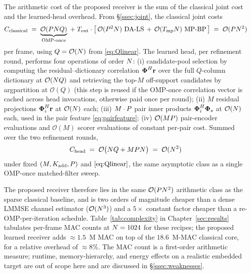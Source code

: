 The arithmetic cost of the proposed receiver is the sum of the classical joint cost and the learned-head overhead. From \S\ref{ssec:joint}, the classical joint costs
\begin{equation}
C_{\text{classical}} \;=\; \underbrace{\mathcal{O}(\Ppath \Nsub Q)}_{\text{OMP-once}} \;+\; T_\text{out} \cdot \bigl[\,\mathcal{O}(\Ppath^2 \Nsub)\ \text{DA-LS}\,+\,\mathcal{O}(T_\text{mp} \Nsub)\ \text{MP-BP}\,\bigr] \;=\; \mathcal{O}(\Ppath \Nsub^2) \label{eq:classcomplex}
\end{equation}
per frame, using $Q = \mathcal{O}(N)$ from \eqref{eq:Qlinear}. The learned head, per refinement round, performs four operations of order $N$:
(i) candidate-pool selection by computing the residual--dictionary correlation $\boldsymbol{\Phi}^H \mathbf{r}$ over the full $Q$-column dictionary at $\mathcal{O}(N Q)$ and retrieving the top-$M$ off-support candidates by argpartition at $\mathcal{O}(Q)$ (this step is reused if the OMP-once correlation vector is cached across head invocations, otherwise paid once per round);
(ii) $M$ residual projections $\boldsymbol{\Phi}_i^H \mathbf{r}$ at $\mathcal{O}(N)$ each;
(iii) $M \cdot P$ pair inner products $\boldsymbol{\Phi}_i^H \boldsymbol{\Phi}_s$ at $\mathcal{O}(N)$ each, used in the pair feature \eqref{eq:pairfeature};
(iv) $\mathcal{O}(M P)$ pair-encoder evaluations and $\mathcal{O}(M)$ scorer evaluations of constant per-pair cost.
Summed over the two refinement rounds,
\begin{equation}
C_{\text{head}} \;=\; \mathcal{O}\bigl(N Q + M P N\bigr) \;=\; \mathcal{O}(N^2) \label{eq:headcomplex}
\end{equation}
under fixed $(M, K_{\mathrm{add}}, P)$ and $\eqref{eq:Qlinear}$, the same asymptotic class as a single OMP-once matched-filter sweep.

The proposed receiver therefore lies in the same $\mathcal{O}(P N^2)$ arithmetic class as the sparse classical baseline, and is two orders of magnitude cheaper than a dense LMMSE channel estimator ($\mathcal{O}(N^3)$) and a $5\times$ constant factor cheaper than a re-OMP-per-iteration schedule. Table~\ref{tab:complexity} in Chapter~\ref{sec:results} tabulates per-frame MAC counts at $N = 1024$ for these recipes; the proposed learned receiver adds $\approx 1.5$~M MAC on top of the $18.6$~M-MAC classical core, for a relative overhead of $\approx 8\%$. The MAC count is a first-order arithmetic measure; runtime, memory-hierarchy, and energy effects on a realistic embedded target are out of scope here and are discussed in \S\ref{ssec:weaknesses}.


